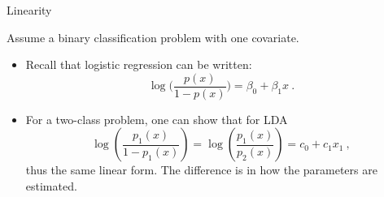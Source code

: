 \documentclass[
  10pt,
  ignorenonframetext,
]{beamer}
\begin{document}
\begin{frame}
\begin{block}{Linearity}
\protect\hypertarget{linearity}{}
\(~\)

Assume a binary classification problem with one covariate.

\vspace{2mm}

\begin{itemize}
\item
  Recall that logistic regression can be written:
  \[\log \Big ( \frac{p(x)}{1-p(x)}\Big ) = \beta_0 + \beta_1 x  \ .\]
\item
  For a two-class problem, one can show that for LDA
  \[\log\left(\frac{p_1(x)}{1-p_1(x)}\right) = \log\left(\frac{p_1(x)}{p_2(x)}\right) = c_0 + c_1 x_1 \ , \]
  thus the same linear form. The difference is in how the parameters are
  estimated.
\end{itemize}
\end{block}
\end{frame}
\end{document}
